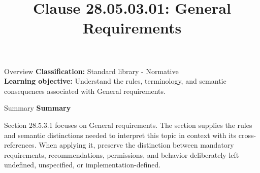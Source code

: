 \documentclass[10pt,letterpaper]{article}
\title{Clause 28.05.03.01: General Requirements}
\author{}
\date{}
\begin{document}
\maketitle
\begin{CornellOverviewBox}{Overview}
\textbf{Classification:} Standard library - Normative\\[2pt]
\textbf{Learning objective:} Understand the rules, terminology, and semantic consequences associated with General requirements.
\end{CornellOverviewBox}\begin{CornellSummaryBox}{Summary}
{\sffamily\bfseries\color{Accent} Summary}\par\vspace{3pt}Section 28.5.3.1 focuses on General requirements. The section supplies the rules and semantic distinctions needed to interpret this topic in context with its cross-references. When applying it, preserve the distinction between mandatory requirements, recommendations, permissions, and behavior deliberately left undefined, unspecified, or implementation-defined.
\end{CornellSummaryBox}
\end{document}
